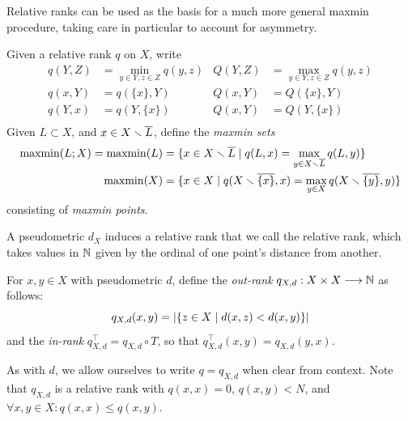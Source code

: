 \documentclass[
]{article}
\begin{document}
Relative ranks can be used as the basis for a much more general maxmin
procedure, taking care in particular to account for asymmetry.

\begin{definition}
Given a relative rank $q$ on $X$, write
\begin{align*}
    q(Y,Z) &= \min_{y\in Y,z\in Z}{q(y,z)} & Q(Y,Z) &= \max_{y\in Y,z\in Z}{q(y,z)} \\
    q(x,Y) &= q(\{x\},Y)                   & Q(x,Y) &= Q(\{x\},Y) \\
    q(Y,x) &= q(Y,\{x\})                   & Q(x,Y) &= Q(Y,\{x\}) \\
\end{align*}
Given $L\subset X$, and $x\in X\smallsetminus \overline{L}$, define the \emph{maxmin sets}
\begin{align*}
    \operatorname{maxmin}(L;X) = \operatorname{maxmin}(L) &= \{x\in X \smallsetminus \overline{L}\mid q(L,x) = \max_{y\in X\smallsetminus \overline{L}}{q(L,y)}\} \\
    \operatorname{maxmin}(X) &= \{x\in X\mid q(X \smallsetminus \overline{\{x\}},x) = \max_{y\in X}{q(X \smallsetminus \overline{\{y\}},y)}\}
\end{align*}
consisting of \emph{maxmin points}.
\end{definition}

A pseudometric \(d_X\) induces a relative rank that we call the relative
rank, which takes values in \(\mathbb{N}\) given by the ordinal of one point's
distance from another.

\begin{definition}
    For $x,y\in X$ with pseudometric $d$, define the \emph{out-rank} $q_{X,d} : X \times X \longrightarrow \mathbb{N}$ as follows:
    \begin{equation}\label{eqn:out-rank}
        q_{X,d}(x,y)=\abs{\{z\in X \mid d(x,z) < d(x,y)\}}%
    \end{equation}
    and the \emph{in-rank} $q_{X,d}^\top = q_{X,d} \circ T$, so that $q_{X,d}^\top(x,y) = q_{X,d}(y,x)$.
\end{definition}

As with \(d\), we allow ourselves to write \(q=q_{X,d}\) when clear from
context. Note that \(q_{X,d}\) is a relative rank with \(q(x,x)=0\),
\(q(x,y) < N\), and \(\forall x,y \in X : q(x,x) \leq q(x,y)\).
\end{document}
